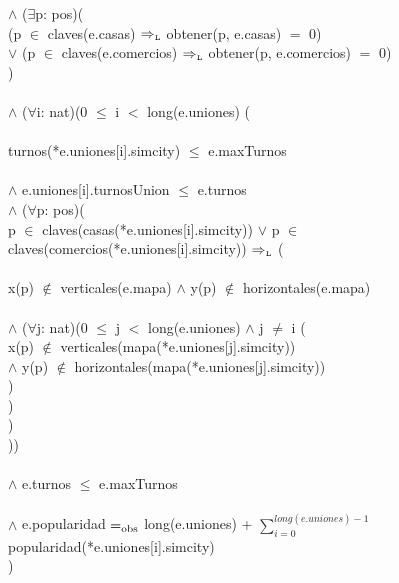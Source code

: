 \begin{Representacion}
    \tab $\land$ ($\exists$p: pos)( \\
    \tab\tab (p $\in$ claves(e.casas) $\Rightarrow_{\mathrm{\scriptscriptstyle{L}}}$ obtener(p, e.casas) $=$ 0) \\
    \tab\tab $\lor$ (p $\in$ claves(e.comercios) $\Rightarrow_{\mathrm{\scriptscriptstyle{L}}}$ obtener(p, e.comercios) $=$ 0) \\
    \tab) \\
     \\
    \tab $\land$ ($\forall$i: nat)(0 $\leq$ i $<$ long(e.uniones) \impluego ( \\
    \tab{} \\
    \tab\tab turnos(*e.uniones[i].simcity) $\leq$ e.maxTurnos \\
    \tab{} \\
    \tab\tab $\land$ e.uniones[i].turnosUnion $\leq$ e.turnos \\
    \tab\tab $\land$ ($\forall$p: pos)( \\
    \tab\tab\tab p $\in$ claves(casas(*e.uniones[i].simcity)) $\lor$ p $\in$ claves(comercios(*e.uniones[i].simcity)) $\Rightarrow_{\mathrm{\scriptscriptstyle{L}}}$ ( \\
    \tab\tab\tab{} \\
    \tab\tab\tab\tab x(p) $\notin$ verticales(e.mapa) $\land$ y(p) $\notin$ horizontales(e.mapa) \\
    \tab\tab\tab{} \\
    \tab\tab\tab\tab $\land$ ($\forall$j: nat)(0 $\leq$ j $<$ long(e.uniones) $\land$ j $\neq$ i \impluego ( \\
    \tab\tab\tab\tab\tab x(p) $\notin$ verticales(mapa(*e.uniones[j].simcity)) \\
    \tab\tab\tab\tab\tab $\land$ y(p) $\notin$ horizontales(mapa(*e.uniones[j].simcity)) \\
    \tab\tab\tab\tab ) \\
    \tab\tab\tab ) \\
    \tab\tab ) \\
    \tab )) \\
     \\
    \tab $\land$ e.turnos $\leq$ e.maxTurnos \\
     \\
    \tab $\land$ e.popularidad $=_{\mathrm{obs}}$ long(e.uniones)
            + $\sum_{i=0}^{long(e.uniones) - 1}$ popularidad(*e.uniones[i].simcity) \\
)


\end{Representacion}
